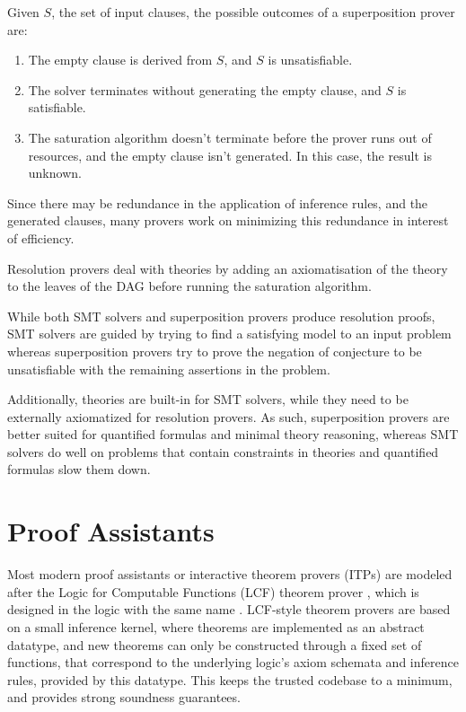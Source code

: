\documentclass{article}
\begin{document}
	Given $S$, the set of input clauses, the possible 
	outcomes of a superposition prover are:
	\begin{enumerate}
		\item The empty clause is derived from $S$, and
		$S$ is unsatisfiable.
		\item The solver terminates without generating the 
		empty clause, and $S$ is satisfiable.
		\item The saturation algorithm doesn't terminate 
		before the prover runs out of resources, and 
		the empty clause isn't generated. In this 
		case, the result is unknown. 
	\end{enumerate}
	
	Since there may be redundance in the application 
	of inference rules, and the generated clauses, 
	many provers work on minimizing this redundance in 
	interest of efficiency.
	
	Resolution provers deal with theories by 
	adding an axiomatisation of the theory to the 
	leaves of the DAG before running the 
	saturation algorithm.
	
	While both SMT solvers and superposition provers 
	produce resolution proofs, SMT solvers are guided 
	by trying to find a satisfying model to an input 
	problem whereas superposition provers try 
	to prove the negation of conjecture to be unsatisfiable
	with the remaining assertions in the problem. 
	
	Additionally, theories are built-in for SMT solvers,
	while they need to be externally axiomatized for 
	resolution provers. As such, superposition provers
	are better suited for quantified formulas and 
	minimal theory reasoning, whereas SMT solvers 
	do well on problems that contain constraints 
	in theories and quantified formulas slow them 
	down.
	
\section{Proof Assistants}
\label{itp}
	Most modern proof assistants or interactive 
	theorem provers (ITPs) are modeled after 
	the Logic for Computable Functions (LCF) theorem
	prover \cite{10.5555/891954}, which is designed 
	in the logic with the same name
	\cite{Loeckx1987}. LCF-style theorem provers are 
	based on a small inference kernel, where theorems 
	are implemented as an abstract datatype, and 
	new theorems can only be constructed through a 
	fixed set of functions, that correspond to the 
	underlying logic's axiom schemata and inference 
	rules, provided by this datatype. This keeps
	the trusted codebase to a minimum, and 
	provides strong soundness guarantees.
	
\end{document}
